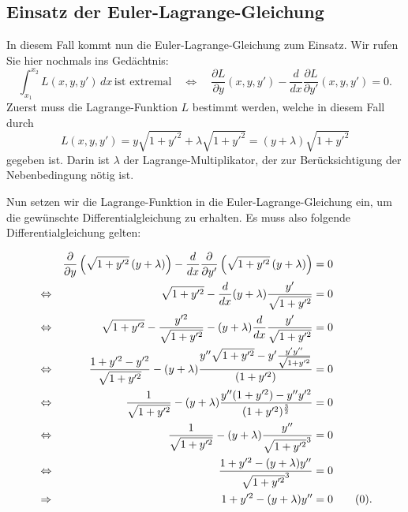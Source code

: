 \subsection{Einsatz der Euler-Lagrange-Gleichung
\label{kettenlinie:subsection:Einsatz der Euler-Lagrange-Gleichung}}
In diesem Fall kommt nun die Euler-Lagrange-Gleichung zum Einsatz.
Wir rufen Sie hier nochmals ins Gedächtnis:
\begin{equation}
	\int_{x_1}^{x_2} L(x, y, y') \, dx \, \text{ist extremal}
\quad\Leftrightarrow\quad
\frac{\partial L}{\partial y}(x, y, y') - \frac{d}{dx} \frac{\partial L}{\partial y'}(x, y, y') = 0.
\end{equation}
Zuerst muss die Lagrange-Funktion \(L\) bestimmt werden, welche in diesem Fall durch
\begin{equation}
	L(x, y, y')
	=
	y \sqrt{1+y'^2} + \lambda \sqrt{1+y'^2}
	=
	(y + \lambda) \sqrt{1+y'^2}
\end{equation}
gegeben ist.
Darin ist \(\lambda\) der Lagrange-Multiplikator, der zur Berücksichtigung der Nebenbedingung nötig ist.

Nun setzen wir die Lagrange-Funktion in die Euler-Lagrange-Gleichung ein, um die gewünschte Differentialgleichung zu erhalten. Es muss also folgende Differentialgleichung gelten:

\begin{align*}
	&                 &
	\frac{\partial}{\partial y} \left( \sqrt{1 + y'^2} \, (y + \lambda) \right) - \frac{d}{dx} \frac{\partial}{\partial y'} \left( \sqrt{1 + y'^2} \, (y + \lambda) \right) 
	&=
	0
	\\
	& \Leftrightarrow &
	\sqrt{1 + y'^2} - \frac{d}{dx} (y + \lambda) \dfrac{y'}{\sqrt{1 + y'^2}}
	&=
	0
	\\
	& \Leftrightarrow &
	\sqrt{1 + y'^2} - \frac{y'^2}{\sqrt{1 + y'^2}} - (y + \lambda) \frac{d}{dx} \frac{y'}{\sqrt{1 + y'^2}}
	&=
	0
	\\
	& \Leftrightarrow &
	\frac{1 + y'^2 - y'^2}{\sqrt{1 + y'^2}} - (y + \lambda) \frac{y'' \sqrt{1 + y'^2} - y' \frac{y' y''}{\sqrt{1 + y'^2}}}{(1 + y'^2)} 
	&=
	0
	\\
	& \Leftrightarrow &
	\frac{1}{\sqrt{1 + y'^2}} - (y + \lambda) \frac{y'' (1 + y'^2) - y''y'^2}{(1 + y'^2)^ \frac{3}{2}} 
	&=
	0
	\\
	& \Leftrightarrow &
	\frac{1}{\sqrt{1 + y'^2}} - (y + \lambda) \frac{y''}{\sqrt{1 + y'^2}^3} 
	&=
	0
	\\
	& \Leftrightarrow &
	\frac{1 + y'^2 - (y + \lambda) y''} {\sqrt{1 + y'^2}^3}
	&=
	0
	\\
	& \Rightarrow &
	1 + y'^2 - (y + \lambda) y''
	&=
	0 \label{kettenlinie:equation_1} \tag{\theequation} \stepcounter{equation}.
\end{align*}

